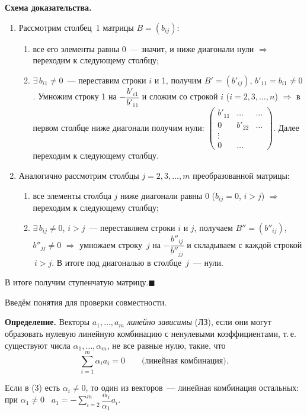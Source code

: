 \documentclass[a4paper,11pt]{article}
\newcommand{\qedr}{\hfill$\blacksquare$}
\begin{document}
\textbf{Схема доказательства.}
\begin{enumerate}[label=\arabic*)]
\item Рассмотрим столбец \textnumero\,1 матрицы $B=(b_{ij})$:
 \begin{enumerate}[label=\alph*)]
 \item все его элементы равны 0~--- значит, и ниже диагонали нули $\Rightarrow$ переходим к следующему
 столбцу;
 \item $\exists\,b_{i1}\ne0$~--- переставим строки $i$ и 1, получим $B'=(b'_{ij})$, $b'_{11}=b_{i1}\ne0$.
 Умножим строку 1 на $-\dfrac{b'_{i1}}{b'_{11}}$ и сложим со строкой $i$ ($i=2,3,\dots,n$) $\Rightarrow$
 в первом столбце ниже диагонали получим нули:
 $\begin{pmatrix}b'_{11}&\dots&\dots\\0&b'_{22}&\dots\\ \vdots&&\\0&\dots&\end{pmatrix}$.
 Далее переходим к следующему столбцу.
 \end{enumerate}
\item Аналогично рассмотрим столбцы $j=2,3,\dots,m$ преобразованной матрицы:
 \begin{enumerate}[label=\alph*)]
 \item все элементы столбца $j$ ниже диагонали равны 0 ($b_{ij}=0$, $i>j$) $\Rightarrow$ переходим
 к следующему столбцу;
 \item $\exists\,b_{ij}\ne0$, $i>j$~--- переставляем строки $i$ и $j$, получаем $B''=(b''_{ij})$,
 $b''_{jj}\ne0$ $\Rightarrow$ умножаем строку \textnumero\,$j$ на $-\dfrac{b''_{ij}}{b''_{jj}}$ и складываем
 с каждой строкой \textnumero\,$i>j$. В итоге под диагональю в столбце \textnumero\,$j$~--- нули.
 \end{enumerate}
\end{enumerate}
В итоге получим ступенчатую матрицу.\qedr

Введём понятия для проверки совместности.
\begin{opr}
\textbf{Определение.} Векторы $a_1,\dots,a_m$ \emph{линейно зависимы} (ЛЗ), если они могут
образовать нулевую линейную комбинацию с ненулевыми коэффициентами, т.\,е. существуют числа
$\alpha_1,\dots,\alpha_m$, не все равные нулю, такие, что
\[
\sum_{i=1}^{m}\alpha_ia_i=0\qquad\text{(линейная комбинация).}\tag{3}
\]
\end{opr}
Если в (3) есть $\alpha_i\ne0$, то один из векторов~--- линейная комбинация остальных: при $\alpha_1\ne0$
\ $a_1=-\sum\limits_{i=2}^{m}\dfrac{\alpha_i}{\alpha_1}a_i$.
\end{document}
